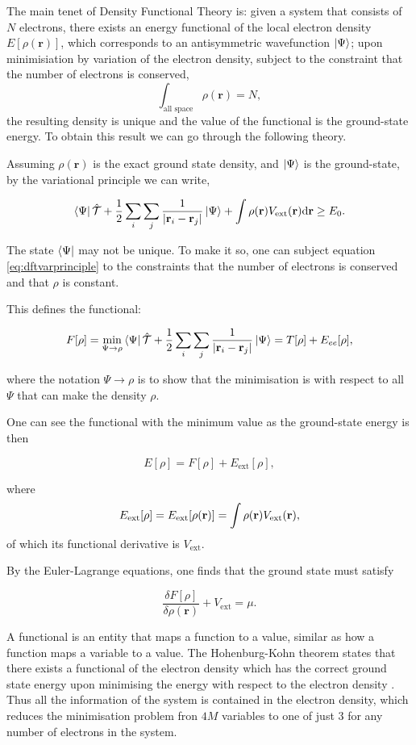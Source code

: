 \documentclass[11pt]{article}
\begin{document}
The main tenet of Density Functional Theory is: given a system that consists of \(N\) electrons,
there exists an energy functional of the local electron density \(E[\rho(\mathbf{r})]\), which
corresponds to an antisymmetric wavefunction \(\ket{\Psi}\); upon minimisiation by
variation of the electron density, subject to the constraint that the number of electrons is
conserved, \[ \int_{\text{all space}} \rho(\mathbf{r}) = N, \] the resulting density is unique
and the value of the functional is the ground-state energy. To obtain this result we can go
through the following theory.

Assuming \(\rho(\mathbf{r})\) is the exact ground state density, and \(\ket{\Psi}\)
is the ground-state, by the variational principle we can write, 

\[ \bra{\Psi} \mathcal{\hat{T}} + \frac{1}{2} \sum_i\sum_j \frac{1}{| \mathbf{r}_i -
\mathbf{r}_j |}  \ket{\Psi} + \int \rho(\mathbf{r}) V_{\text{ext}}(\mathbf{r})
\text{d}\mathbf{r} \geq E_0. 
\label{eq:dftvarprinciple} \]

The state \(\bra{\Psi}\) may not be unique. To make it so, one can subject equation \ref{eq:dftvarprinciple}
to the constraints that the number of electrons is conserved and that \(\rho\) is constant. 

This defines the functional: 

\[ F[\rho] = \underset{\Psi \rightarrow \rho}{\text{min}} \bra{\Psi} \mathcal{\hat{T}} +
\frac{1}{2} \sum_i\sum_j \frac{1}{| \mathbf{r}_i - \mathbf{r}_j |}  \ket{\Psi} = T[\rho] +
E_{ee}[\rho],   \]

where the notation \(\Psi \rightarrow \rho\) is to show that the minimisation is with respect to
all \(\Psi\) that can make the density \(\rho\). 

One can see the functional with the minimum value as the ground-state energy is then 

\[ E[\rho] = F[\rho] + E_{\text{ext}}[\rho], \]

where \[ E_{\text{ext}}[\rho] = E_{\text{ext}}[\rho(\mathbf{r})] =  \int \rho(\mathbf{r})
V_{\text{\text{ext}}}(\mathbf{r}), \]
of which its functional derivative is \(V_{\text{ext}}\).

By the Euler-Lagrange equations, one finds that the ground state must satisfy 

\[ \frac{\delta F[\rho]}{\delta \rho(\mathbf{r}) } + V_{\text{ext}}= \mu. \]

A functional is an entity that maps a function to a value, similar as how a function maps a
variable to a value. The Hohenburg-Kohn theorem states that there exists a functional of the
electron density which has the correct ground state energy upon minimising the energy with respect to
the electron density \cite{hohenburg64_inhomog_electron_gas}. Thus all the information of the
system is contained in the electron density, which reduces the minimisation
problem fron \(4M\) variables to one of just 3 for any number of electrons in the system. 
\end{document}
